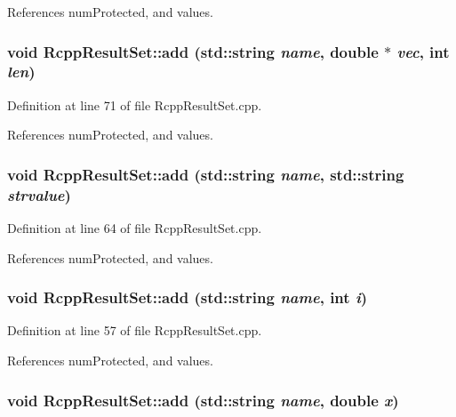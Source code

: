 References numProtected, and values.\hypertarget{classRcppResultSet_a5d06d8a4f0497abc6fad4ea22b4934f9}{
\subsubsection[{add}]{\setlength{\rightskip}{0pt plus 5cm}void RcppResultSet::add (std::string {\em name}, \/  double $\ast$ {\em vec}, \/  int {\em len})}}
\label{classRcppResultSet_a5d06d8a4f0497abc6fad4ea22b4934f9}


Definition at line 71 of file RcppResultSet.cpp.

References numProtected, and values.\hypertarget{classRcppResultSet_a2633372ab2f50b269e9e26dd7a489492}{
\subsubsection[{add}]{\setlength{\rightskip}{0pt plus 5cm}void RcppResultSet::add (std::string {\em name}, \/  std::string {\em strvalue})}}
\label{classRcppResultSet_a2633372ab2f50b269e9e26dd7a489492}


Definition at line 64 of file RcppResultSet.cpp.

References numProtected, and values.\hypertarget{classRcppResultSet_a8b7841ff8a52477b0c6a1fb7c03c0fd9}{
\subsubsection[{add}]{\setlength{\rightskip}{0pt plus 5cm}void RcppResultSet::add (std::string {\em name}, \/  int {\em i})}}
\label{classRcppResultSet_a8b7841ff8a52477b0c6a1fb7c03c0fd9}


Definition at line 57 of file RcppResultSet.cpp.

References numProtected, and values.\hypertarget{classRcppResultSet_a7c7da37f18bd352303bf06b7c5233bc4}{
\subsubsection[{add}]{\setlength{\rightskip}{0pt plus 5cm}void RcppResultSet::add (std::string {\em name}, \/  double {\em x})}}
\label{classRcppResultSet_a7c7da37f18bd352303bf06b7c5233bc4}


